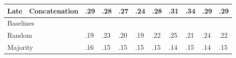 \documentclass{article}
\begin{document}
\begin{table}[H]
\begin{tabular}{|lllllllllll|}
\multicolumn{1}{|l|}{Late}                   & \multicolumn{1}{l|}{Concatenation} & .29                & .28                & .27                & .24                & .28                & .31                & .34                & \multicolumn{1}{l|}{.29}                & .29                   \\ \hline
\multicolumn{11}{|l|}{Baselines}                                                                                                                                                                                                                                                                       \\ \hline
\multicolumn{2}{|l|}{Random}                                                      & .19                & .23                & .20                & .19                & .22                & .25                & .21                & \multicolumn{1}{l|}{.24}                & .22                   \\
\multicolumn{2}{|l|}{Majority}                                                    & .16                & .15                & .15                & .15                & .15                & .14                & .15                & \multicolumn{1}{l|}{.14}                & .15                  \\ \hline
\end{tabular}
\end{table}
\end{document}
